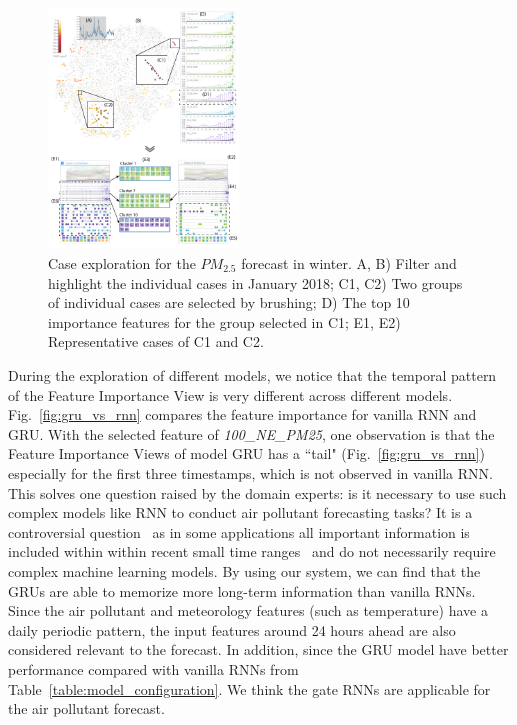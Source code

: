 \begin{figure}[t]
	\centering
	\includegraphics[width=0.45\textwidth]{pictures/Evaluation/winter_exploration.pdf}
	\vspace{-3mm}
	\caption{Case exploration for the $PM_{2.5}$ forecast in winter. A, B) Filter and highlight the individual cases in January 2018; C1, C2) Two groups of individual cases are selected by brushing; D) The top 10 importance features for the group selected in C1; E1, E2) Representative cases of C1 and C2.}
	\label{fig:winter_exploration}
	\vspace{-4mm}
\end{figure}
During the exploration of different models, we notice that the temporal pattern of the Feature Importance View is very different across different models. 
Fig.~\ref{fig:gru_vs_rnn} compares the feature importance for vanilla RNN and GRU.
With the selected feature of \textit{100\_NE\_PM25}, one observation is that the Feature Importance Views of model GRU has a ``tail" (Fig.~\ref{fig:gru_vs_rnn}) especially for the first three timestamps, which is not observed in vanilla RNN.
This solves one question raised by the domain experts: is it necessary to use such complex models like RNN to conduct air pollutant forecasting tasks?
It is a controversial question~\cite{brownlee2017long} as in some applications all important information is included within within recent small time ranges~\cite{gers2002applying} and do not necessarily require complex machine learning models. 
By using our system, we can find that the GRUs are able to memorize more long-term information than vanilla RNNs. 
Since the air pollutant and meteorology features (such as temperature) have a daily periodic pattern, the input features around 24 hours ahead are also considered relevant to the forecast. 
In addition, since the GRU model have better performance compared with vanilla RNNs from Table~\ref{table:model_configuration}. 
We think the gate RNNs are applicable for the air pollutant forecast. 

